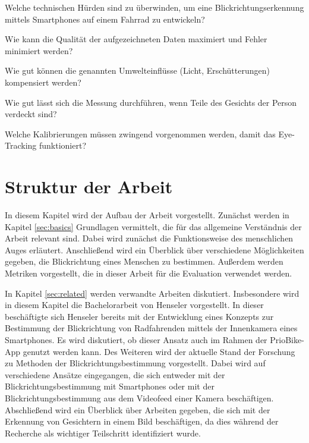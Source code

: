 \begin{researchquestion}\label{rq:technical_problems}
Welche technischen Hürden sind zu überwinden, um eine Blickrichtungserkennung mittels
Smartphones auf einem Fahrrad zu entwickeln?
\end{researchquestion}

\begin{researchquestion}\label{rq:qc}
Wie kann die Qualität der aufgezeichneten Daten maximiert und Fehler minimiert werden?
\end{researchquestion}

\begin{researchquestion}\label{rq:umwelt}
Wie gut können die genannten Umwelteinflüsse (Licht, Erschütterungen) kompensiert werden?
\end{researchquestion}

\begin{researchquestion}\label{rq:verdeckt}
Wie gut lässt sich die Messung durchführen, wenn Teile des Gesichts der Person verdeckt sind?
\end{researchquestion}

\begin{researchquestion}\label{rq:kalibrierung}
Welche Kalibrierungen müssen zwingend vorgenommen werden, damit das Eye-Tracking funktioniert?
\end{researchquestion}

\section{Struktur der Arbeit}\label{sec:introduction:structure}

In diesem Kapitel wird der Aufbau der Arbeit vorgestellt. Zunächst werden in Kapitel \ref{sec:basics} Grundlagen vermittelt, die für das allgemeine Verständnis der Arbeit relevant sind. Dabei wird zunächst die Funktionsweise des menschlichen Auges erläutert. Anschließend wird ein Überblick über verschiedene Möglichkeiten gegeben, die Blickrichtung eines Menschen zu bestimmen. Außerdem werden Metriken vorgestellt, die in dieser Arbeit für die Evaluation verwendet werden.

In Kapitel \ref{sec:related} werden verwandte Arbeiten diskutiert. Insbesondere wird in diesem Kapitel die Bachelorarbeit von Henseler \cite{bachelor:henseler:gaze-ebikes} vorgestellt. In dieser beschäftigte sich Henseler bereits mit der Entwicklung eines Konzepts zur Bestimmung der Blickrichtung von Radfahrenden mittels der Innenkamera eines Smartphones. Es wird diskutiert, ob dieser Ansatz auch im Rahmen der PrioBike-App genutzt werden kann. Des Weiteren wird der aktuelle Stand der Forschung zu Methoden der Blickrichtungsbestimmung vorgestellt. Dabei wird auf verschiedene Ansätze eingegangen, die sich entweder mit der Blickrichtungsbestimmung mit Smartphones oder mit der Blickrichtungsbestimmung aus dem Videofeed einer Kamera beschäftigen. Abschließend wird ein Überblick über Arbeiten gegeben, die sich mit der Erkennung von Gesichtern in einem Bild beschäftigen, da dies während der Recherche als wichtiger Teilschritt identifiziert wurde.

